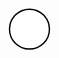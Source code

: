 \documentclass[10pt]{article}
\theoremstyle{plain}
\theoremstyle{remark}
\begin{document}
\[\begin{pgfpicture}
\begin{pgfscope}
\pgfpathcurveto{\pgfqpoint{3.194831in}{2.002056in}}{\pgfqpoint{3.215527in}{2.052020in}}{\pgfqpoint{3.215527in}{2.104111in}}%
\pgfpathcurveto{\pgfqpoint{3.215527in}{2.156202in}}{\pgfqpoint{3.194831in}{2.206166in}}{\pgfqpoint{3.157997in}{2.243000in}}%
\pgfpathcurveto{\pgfqpoint{3.121164in}{2.279834in}}{\pgfqpoint{3.071199in}{2.300529in}}{\pgfqpoint{3.019108in}{2.300529in}}%
\pgfpathcurveto{\pgfqpoint{2.967018in}{2.300529in}}{\pgfqpoint{2.917053in}{2.279834in}}{\pgfqpoint{2.880220in}{2.243000in}}%
\pgfpathcurveto{\pgfqpoint{2.843386in}{2.206166in}}{\pgfqpoint{2.822690in}{2.156202in}}{\pgfqpoint{2.822690in}{2.104111in}}%
\pgfpathcurveto{\pgfqpoint{2.822690in}{2.052020in}}{\pgfqpoint{2.843386in}{2.002056in}}{\pgfqpoint{2.880220in}{1.965222in}}%
\pgfpathcurveto{\pgfqpoint{2.917053in}{1.928388in}}{\pgfqpoint{2.967018in}{1.907692in}}{\pgfqpoint{3.019108in}{1.907692in}}%
\pgfpathclose%
\pgfusepath{stroke,fill}%
\end{pgfscope}%
\begin{pgfscope}%
\pgfsetbuttcap%
\pgfsetroundjoin%
\definecolor{currentfill}{rgb}{1.000000,1.000000,1.000000}%
\pgfsetfillcolor{currentfill}%
\pgfsetlinewidth{1.003750pt}%
\definecolor{currentstroke}{rgb}{0.000000,0.000000,0.000000}%
\pgfsetstrokecolor{currentstroke}%
\pgfsetdash{}{0pt}%
\pgfpathmoveto{\pgfqpoint{2.120294in}{0.100000in}}%
\pgfpathcurveto{\pgfqpoint{2.172385in}{0.100000in}}{\pgfqpoint{2.222349in}{0.120696in}}{\pgfqpoint{2.259183in}{0.157530in}}%
\pgfpathcurveto{\pgfqpoint{2.296017in}{0.194363in}}{\pgfqpoint{2.316713in}{0.244328in}}{\pgfqpoint{2.316713in}{0.296419in}}%
\pgfpathcurveto{\pgfqpoint{2.316713in}{0.348509in}}{\pgfqpoint{2.296017in}{0.398474in}}{\pgfqpoint{2.259183in}{0.435307in}}%
\pgfpathcurveto{\pgfqpoint{2.222349in}{0.472141in}}{\pgfqpoint{2.172385in}{0.492837in}}{\pgfqpoint{2.120294in}{0.492837in}}%
\pgfpathcurveto{\pgfqpoint{2.068204in}{0.492837in}}{\pgfqpoint{2.018239in}{0.472141in}}{\pgfqpoint{1.981405in}{0.435307in}}%
\pgfpathcurveto{\pgfqpoint{1.944572in}{0.398474in}}{\pgfqpoint{1.923876in}{0.348509in}}{\pgfqpoint{1.923876in}{0.296419in}}%
\pgfpathcurveto{\pgfqpoint{1.923876in}{0.244328in}}{\pgfqpoint{1.944572in}{0.194363in}}{\pgfqpoint{1.981405in}{0.157530in}}%
\pgfpathcurveto{\pgfqpoint{2.018239in}{0.120696in}}{\pgfqpoint{2.068204in}{0.100000in}}{\pgfqpoint{2.120294in}{0.100000in}}%
\pgfpathclose%
\pgfusepath{stroke,fill}%
\end{pgfscope}%
\begin{pgfscope}%
\pgfsetbuttcap%
\pgfsetroundjoin%
\definecolor{currentfill}{rgb}{1.000000,1.000000,1.000000}%

\end{pgfscope}
\end{pgfpicture}\]
\end{document}
